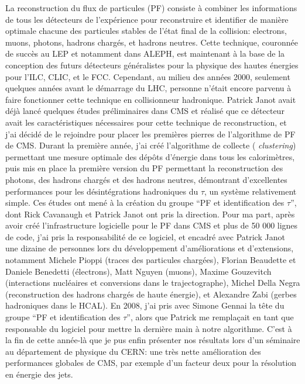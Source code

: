 \documentclass[11pt,twoside,a4paper,tdr]{cms-tdr}
\begin{document}
La reconstruction du flux de particules (PF) consiste à combiner les informations de tous les détecteurs de l'expérience pour reconstruire et identifier de manière optimale chacune des particules stables de l'état final de la collision: electrons, muons, photons, hadrons chargés, et hadrons neutres. 
Cette technique, couronnée de succès au LEP et notamment dans ALEPH, 
est maintenant à la base de la conception des futurs détecteurs généralistes pour la physique des hautes énergies 
pour l'ILC, CLIC, et le FCC. 
Cependant, au milieu des années 2000, seulement quelques années avant le démarrage du LHC, 
personne n'était encore parvenu à faire fonctionner cette technique en collisionneur hadronique.
Patrick Janot avait déjà lancé quelques études préliminaires dans CMS et réalisé que ce détecteur avait les caractéristiques nécessaires pour cette technique de reconstruction, 
et j'ai décidé de le rejoindre pour placer les premières pierres de l'algorithme de PF de CMS.
Durant la première année, j'ai créé l'algorithme de collecte ({\em
  clustering}) permettant une mesure optimale des dépôts d'énergie
dans tous les calorimètres, puis mis en place la première version du PF permettant la reconstruction des photons, des hadrons chargés et des hadrons neutres, 
démontrant d'excellentes performances pour les désintégrations hadroniques du $\tau$, un système relativement simple.
Ces études ont mené à la création du groupe ``PF et identification des $\tau$'', dont Rick Cavanaugh et Patrick Janot ont pris la direction. 
Pour ma part, après avoir créé l'infrastructure logicielle pour le PF dans CMS et plus de 50 000 lignes de code, j'ai pris la responsabilité de ce logiciel, et encadré avec Patrick Janot une dizaine de personnes lors du développement d'améliorations et d'extensions, notamment Michele Pioppi (traces des particules chargées), Florian Beaudette et Daniele Benedetti (électrons), Matt Nguyen (muons), Maxime Gouzevitch (interactions nucléaires et conversions dans le trajectographe), Michel Della Negra (reconstruction des hadrons chargés de haute énergie), et Alexandre Zabi (gerbes hadroniques dans le HCAL).
En 2008, j'ai pris avec Simone Gennai la tête du groupe ``PF et identification des $\tau$'', alors que Patrick me remplaçait en tant que responsable du logiciel pour mettre la dernière main à notre algorithme. 
C'est à la fin de cette année-là que je pus enfin présenter nos résultats lors d'un séminaire au département de physique du CERN: une très nette amélioration des performances globales de CMS, par exemple d'un facteur deux pour la résolution en énergie des jets. 
\end{document}

